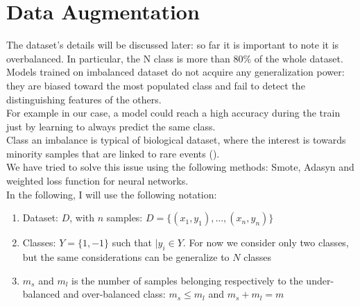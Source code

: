 \documentclass[LaM,binding=0.6cm]{sapthesis}
\begin{document}
\section{Data Augmentation}
The dataset's details will be discussed later: so far it is important to note it is overbalanced. In particular, the N class is more than 80\% of the whole dataset.\\Models trained on imbalanced dataset do not acquire any generalization power: they are biased toward the most populated class and fail to detect the distinguishing features of the others.\\For example in our case, a model could reach a high accuracy during the train just by learning to always predict the same class.\\Class an imbalance is typical of biological dataset, where the interest is towards minority samples that are linked to rare events (\cite{conf/ijcnn/HeBGL08}).\\We have tried to solve this issue using the following methods: Smote, Adasyn and weighted loss function for neural networks.\\In the following, I will use the following notation:
\begin{enumerate}
\item Dataset: $D$, with $n$ samples: $D=\{(x_1,y_1),\dots,(x_n,y_n)\}$
\item Classes: $Y=\{1,-1\}$ such that $|y_i \in Y$. For now we consider only two classes, but the same considerations can be generalize to $N$ classes 
\item $m_s$ and $m_l$ is the number of samples belonging respectively to the under-balanced and over-balanced class: $m_s\leq m_l$ and $m_s+m_l=m$
\end{enumerate}
\end{document}
